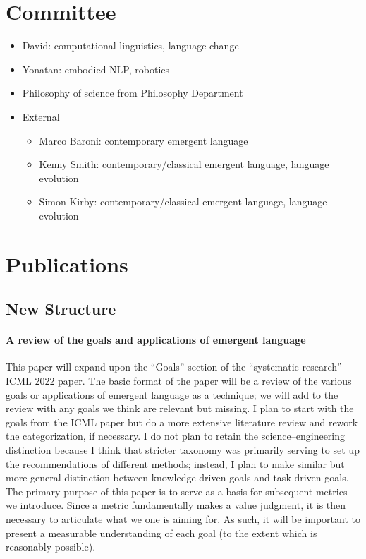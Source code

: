 \section{Committee}
\begin{itemize}
    \item David: computational linguistics, language change
    \item Yonatan: embodied NLP, robotics
    \item {} Philosophy of science from Philosophy Department
    \item {} External
        \begin{itemize}
        \item Marco Baroni: contemporary emergent language
        \item Kenny Smith: contemporary/classical emergent language, language evolution
        \item Simon Kirby: contemporary/classical emergent language, language evolution
        \end{itemize}
\end{itemize}

\section{Publications}

\subsection{New Structure}



\paragraph{A review of the goals and applications of emergent language}
This paper will expand upon the ``Goals'' section of the ``systematic research'' ICML 2022 paper.
The basic format of the paper will be a review of the various goals or applications of emergent language as a technique; we will add to the review with any goals we think are relevant but missing.
I plan to start with the goals from the ICML paper but do a more extensive literature review and rework the categorization, if necessary.
I do not plan to retain the science--engineering distinction because I think that stricter taxonomy was primarily serving to set up the recommendations of different methods; instead, I plan to make similar but more general distinction between knowledge-driven goals and task-driven goals.
The primary purpose of this paper is to serve as a basis for subsequent metrics we introduce.
Since a metric fundamentally makes a value judgment, it is then necessary to articulate what we one is aiming for.
As such, it will be important to present a measurable understanding of each goal (to the extent which is reasonably possible).

